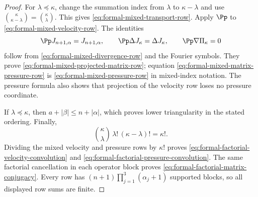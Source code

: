 \begin{proof}
For \(\lambda\preceq\kappa\), change the summation index from \(\lambda\)
to \(\kappa-\lambda\) and use
\(\binom\kappa{\kappa-\lambda}=\binom\kappa\lambda\).  This gives
\eqref{eq:formal-mixed-transport-row}.  Apply \(\Pp\) to
\eqref{eq:formal-mixed-velocity-row}.  The identities
\[
 \Pp J_{n+1,\alpha}=J_{n+1,\alpha},
 \qquad
 \Pp\Delta J_\kappa=\Delta J_\kappa,
 \qquad
 \Pp\nabla\Pi_\kappa=0
\]
follow from \eqref{eq:formal-mixed-divergence-row} and the Fourier symbols.
They prove \eqref{eq:formal-mixed-projected-matrix-row}; equation
\eqref{eq:formal-mixed-matrix-pressure-row} is
\eqref{eq:formal-mixed-pressure-row} in mixed-index notation.  The pressure
formula also shows that projection of the velocity row loses no pressure
coordinate.

If \(\lambda\preceq\kappa\), then
\(a+|\beta|\le n+|\alpha|\), which proves lower triangularity in the stated
ordering.  Finally,
\[
 \binom\kappa\lambda\,\lambda!\,(\kappa-\lambda)!=\kappa!.
\]
Dividing the mixed velocity and pressure rows by \(\kappa!\) proves
\eqref{eq:formal-factorial-velocity-convolution} and
\eqref{eq:formal-factorial-pressure-convolution}.  The same factorial
cancellation in each operator block proves
\eqref{eq:formal-factorial-matrix-conjugacy}.  Every row has
\((n+1)\prod_{j=1}^3(\alpha_j+1)\) supported blocks, so all displayed row
sums are finite.
\end{proof}

